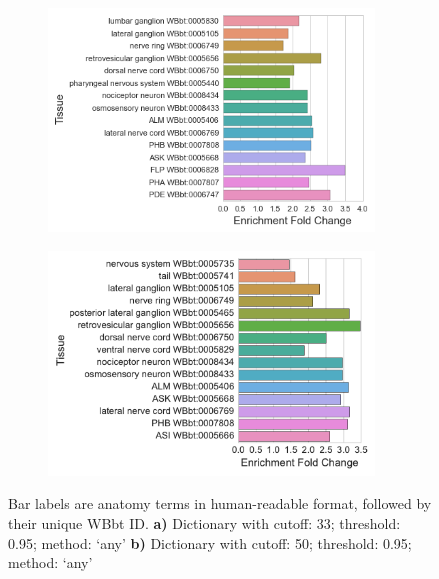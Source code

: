 \documentclass{bmcart}
\begin{document}
\begin{backmatter}
\begin{figure}
  \begin{subfigure}[b]{0.95\textwidth}
    \includegraphics[width=0.95\textwidth]{WBPaper00031532_Larva_Pan_Neuronal_Enriched_WBbt_0003679_1603_33cutoff.png}
    \caption{}
    \label{fig:PanNeuronalWatson33}
  \end{subfigure}
  \begin{subfigure}[b]{0.95\textwidth}
    \includegraphics[width=0.95\textwidth]{WBPaper00031532_Larva_Pan_Neuronal_Enriched_WBbt_0003679_1603_50cutoff}
    \caption{}
    \label{fig:PanNeuronalWatson50}
  \end{subfigure}
  \captionsetup{width= 0.95\textwidth}
  \caption{
	Bar labels are anatomy terms in human-readable format, followed by their unique WBbt ID.
   \textbf{a)} Dictionary with cutoff: 33; threshold: 0.95; method: `any'
   \textbf{b)} Dictionary with cutoff: 50; threshold: 0.95; method: `any'
   }
   \label{fig:interagree}
\end{figure}


\end{backmatter}
\end{document}

